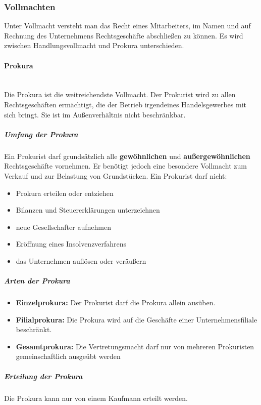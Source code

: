 \subsubsection{Vollmachten}
Unter Vollmacht versteht man das Recht eines Mitarbeiters, im Namen und auf Rechnung des Unternehmens Rechtsgeschäfte abschließen zu können. Es wird zwischen Handlungsvollmacht und Prokura unterschieden.
	
\paragraph{Prokura}~\\
Die Prokura ist die weitreichendste Vollmacht. Der Prokurist wird zu allen Rechtsgeschäften ermächtigt, die der Betrieb irgendeines Handelsgewerbes mit sich bringt. Sie ist im Außenverhältnis nicht beschränkbar.
	
\subparagraph{Umfang der Prokura} Ein Prokurist darf grundsätzlich alle {\bf gewöhnlichen} und {\bf außergewöhnlichen} Rechtsgeschäfte vornehmen. Er benötigt jedoch eine besondere Vollmacht zum Verkauf und zur Belastung von Grundstücken. Ein Prokurist darf nicht:
\begin{itemize}
\setlength\itemsep{0em}
	\item Prokura erteilen oder entziehen
	\item Bilanzen und Steuererklärungen unterzeichnen
	\item neue Gesellschafter aufnehmen
	\item Eröffnung eines Insolvenzverfahrens
	\item das Unternehmen auflösen oder veräußern
\end{itemize}
	
\subparagraph{Arten der Prokura}
\begin{itemize}
\setlength\itemsep{0em}
	\item {\bf Einzelprokura:} Der Prokurist darf die Prokura allein ausüben.
	\item {\bf Filialprokura:} Die Prokura wird auf die Geschäfte einer Unternehmensfiliale beschränkt.
	\item {\bf Gesamtprokura:} Die Vertretungsmacht darf nur von mehreren Prokuristen gemeinschaftlich ausgeübt werden
\end{itemize}
	
\subparagraph{Erteilung der Prokura} Die Prokura kann nur von einem Kaufmann erteilt werden.
	
